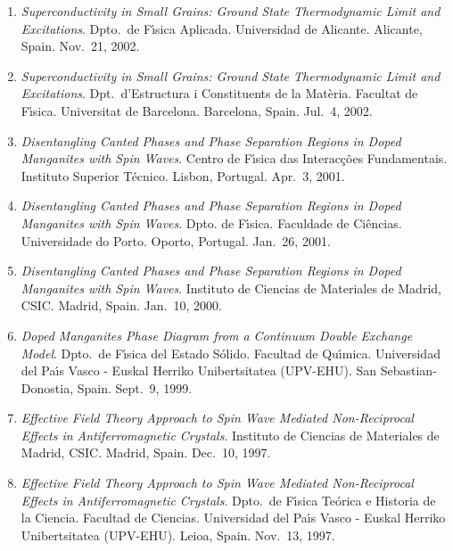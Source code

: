 \documentclass{article}
\begin{document}
\begin{enumerate}
\item
{\it Superconductivity in Small Grains: Ground State Thermodynamic 
Limit and Excitations}.
Dpto.~de F\'{\i}sica Aplicada. Universidad de Alicante.
Alicante, Spain.
Nov.~21, 2002.

\item
{\it Superconductivity in Small Grains: Ground State Thermodynamic 
Limit and Excitations}.
Dpt.~d'Estruc\-tura i Constituents de la Mat\`eria.
Facultat de F\'{\i}sica. Universitat de Barcelona.
Barcelona, Spain.
Jul.~4, 2002.

\item 
{\it Disentangling Canted Phases and Phase Separation Regions 
in Doped Manganites with Spin Waves}.
Centro de F\'{\i}sica das Interac\c c\~oes Fundamentais. 
Instituto Superior T\'ecnico.
Lisbon, Portugal.
Apr.~3, 2001.

\item 
{\it Disentangling Canted Phases and Phase Separation Regions 
in Doped Manganites with Spin Waves}.
Dpto. de F\'{\i}sica. 
Faculdade de Ci\^encias.
Universidade do Porto.
Oporto, Portugal.
Jan.~26, 2001.

\item 
{\it Disentangling Canted Phases and Phase Separation Regions 
in Doped Manganites with Spin Waves}.
Instituto de Ciencias de Materiales de Madrid, CSIC. 
Madrid, Spain.
Jan.~10, 2000.

\item 
{\it Doped Manganites Phase Diagram from a Continuum Double Exchange Model}. 
Dpto.~de F\'{\i}sica del Estado S\'olido. Facultad de Qu{\'\i}mica.  
Universidad del Pa\'{\i}s Vasco - Euskal Herriko Unibertsitatea (UPV-EHU). 
San Sebastian-Donostia, Spain.
Sept.~9, 1999.

\item 
{\it Effective Field Theory Approach to Spin Wave Mediated 
Non-Reciprocal Effects in Antiferromagnetic Crystals}. 
Instituto de Ciencias de Materiales de Madrid, CSIC. 
Madrid, Spain.
Dec.~10, 1997. 

\item 
{\it Effective Field Theory Approach to Spin Wave Mediated 
Non-Reciprocal Effects in Antiferromagnetic Crystals}. 
Dpto.\ de F\'{\i}sica Te\'orica e Historia de la Ciencia. 
Facultad de Ciencias. 
Universidad del Pa\'{\i}s Vasco - Euskal Herriko Unibertsitatea (UPV-EHU). 
Leioa, Spain.
Nov.~13, 1997. 
\end{enumerate}
\end{document}
